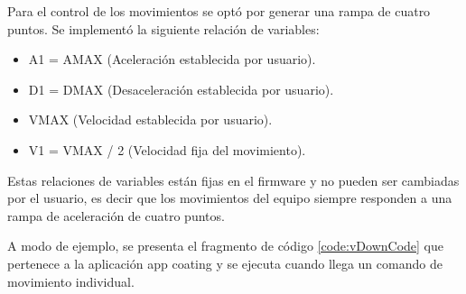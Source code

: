 %
%
%

Para el control de los movimientos se optó por generar una rampa de cuatro puntos. Se implementó la siguiente relación de variables:

\begin{itemize}
\item A1 = AMAX  (Aceleración establecida por usuario).
\item D1 = DMAX  (Desaceleración establecida por usuario).
\item VMAX 	  (Velocidad establecida por usuario).
\item V1 = VMAX / 2 (Velocidad fija del movimiento).

\end{itemize}

Estas relaciones de variables están fijas en el firmware y no pueden ser cambiadas por el usuario, es decir que los movimientos del equipo siempre responden a una rampa de aceleración de cuatro puntos.


A modo de ejemplo, se presenta el fragmento de código \ref{code:vDownCode} que pertenece a la aplicación app coating y se ejecuta cuando llega un comando de movimiento individual.


